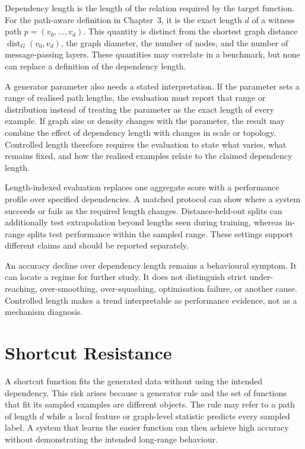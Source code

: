 Dependency length is the length of the relation required by the target function.
For the path-aware definition in Chapter~3, it is the exact length $d$ of a witness path $p=(v_0,\ldots,v_d)$.
This quantity is distinct from the shortest graph distance $\operatorname{dist}_G(v_0,v_d)$, the graph diameter, the number of nodes, and the number of message-passing layers.
These quantities may correlate in a benchmark, but none can replace a definition of the dependency length.

A generator parameter also needs a stated interpretation.
If the parameter sets a range of realised path lengths, the evaluation must report that range or distribution instead of treating the parameter as the exact length of every example.
If graph size or density changes with the parameter, the result may combine the effect of dependency length with changes in scale or topology.
Controlled length therefore requires the evaluation to state what varies, what remains fixed, and how the realised examples relate to the claimed dependency length.

Length-indexed evaluation replaces one aggregate score with a performance profile over specified dependencies.
A matched protocol can show where a system succeeds or fails as the required length changes.
Distance-held-out splits can additionally test extrapolation beyond lengths seen during training, whereas in-range splits test performance within the sampled range.
These settings support different claims and should be reported separately.

An accuracy decline over dependency length remains a behavioural symptom.
It can locate a regime for further study.
It does not distinguish strict under-reaching, over-smoothing, over-squashing, optimisation failure, or another cause.
Controlled length makes a trend interpretable as performance evidence, not as a mechanism diagnosis.

\section{Shortcut Resistance}

A shortcut function fits the generated data without using the intended dependency.
This risk arises because a generator rule and the set of functions that fit its sampled examples are different objects.
The rule may refer to a path of length $d$ while a local feature or graph-level statistic predicts every sampled label.
A system that learns the easier function can then achieve high accuracy without demonstrating the intended long-range behaviour.


